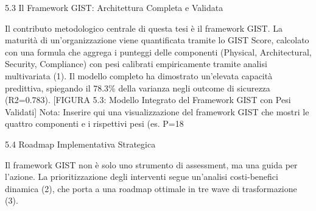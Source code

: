 5.3 Il Framework GIST: Architettura Completa e Validata

Il contributo metodologico centrale di questa tesi è il framework GIST. La maturità di un'organizzazione viene quantificata tramite lo GIST Score, calcolato con una formula che aggrega i punteggi delle componenti (Physical, Architectural, Security, Compliance) con pesi calibrati empiricamente tramite analisi multivariata (1). Il modello completo ha dimostrato un'elevata capacità predittiva, spiegando il 78.3\% della varianza negli outcome di sicurezza (R2=0.783).
[FIGURA 5.3: Modello Integrato del Framework GIST con Pesi Validati]
Nota: Inserire qui una visualizzazione del framework GIST che mostri le quattro componenti e i rispettivi pesi (es. P=18%

5.4 Roadmap Implementativa Strategica

Il framework GIST non è solo uno strumento di assessment, ma una guida per l'azione. La prioritizzazione degli interventi segue un'analisi costi-benefici dinamica (2), che porta a una roadmap ottimale in tre wave di trasformazione (3).


